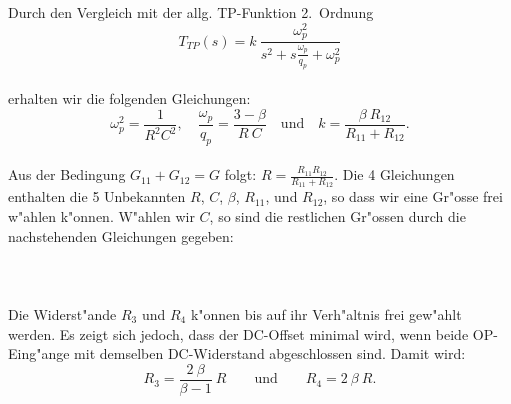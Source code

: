 \nit Durch den Vergleich mit der allg. TP-Funktion 2.~Ordnung
\begin{equation*}
T_{TP}(s)=k~ \frac{\omega_p^2}{s^2 + s \displaystyle\frac{\omega_p}{q_p} 
+ \omega_p^2}
\end{equation*}\\
\nit erhalten wir die folgenden Gleichungen:
\begin{equation*}
\omega_p^2=\frac{1}{R^2 C^2},\quad\frac{\omega_p}{q_p}=\frac{3-\beta}{R~C}\quad\text{und}\quad
k=\frac{\beta ~R_{12}}{R_{11} + R_{12}}. 
\end{equation*}\\
\nit Aus der Bedingung  $G_{11}+G_{12}=G$ folgt: $R=\frac{R_{11} R_{12}}{R_{11} + R_{12}}$. 
Die 4 Gleichungen enthalten die 5 Unbekannten $R$, $C$, $\beta $,
$R_{11}$, und $R_{12}$, so dass wir eine Gr"osse frei w"ahlen k"onnen.
W"ahlen wir $C$, so sind die restlichen Gr"ossen durch die
nachstehenden Gleichungen gegeben:\\~~\\
\\~~\\
\nit Die Widerst"ande $R_3$ und $R_4$ k"onnen bis auf ihr Verh"altnis
frei gew"ahlt werden.  Es zeigt sich jedoch, dass der DC-Offset
minimal wird, wenn beide OP-Eing"ange mit demselben DC-Widerstand
abgeschlossen sind. Damit wird:
\begin{equation*}
R_3=\frac{2 ~\beta }{\beta-1} ~R\qquad \text{und}\qquad R_4=2~\beta ~R.
\end{equation*}
